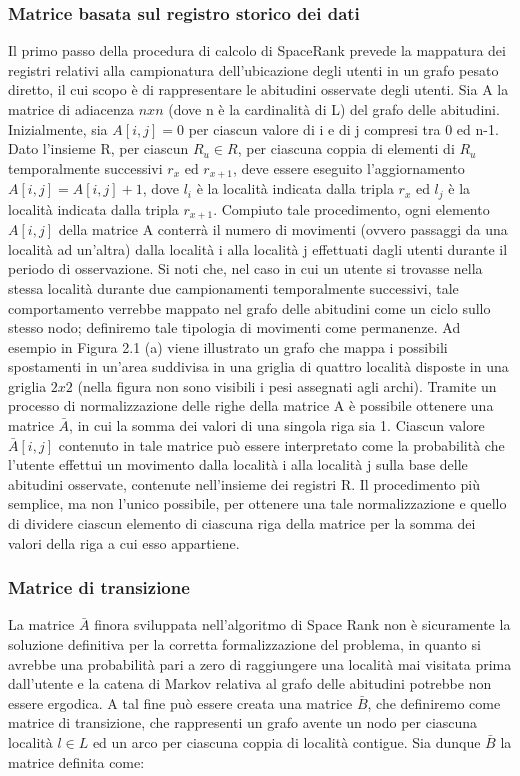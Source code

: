 \subsubsection{Matrice basata sul registro storico dei dati}
Il primo passo della procedura di calcolo di SpaceRank prevede la mappatura
dei registri relativi alla campionatura dell'ubicazione degli utenti in un grafo
pesato diretto, il cui scopo \`e di rappresentare le abitudini osservate degli utenti.
Sia A la matrice di adiacenza $n x n$ (dove n \`e la cardinalit\`a di L) del
grafo delle abitudini. Inizialmente, sia $A[i, j] = 0$ per ciascun valore di i e di
j compresi tra 0 ed n-1. Dato l'insieme R, per ciascun $R_{u} \in R$, per ciascuna
coppia di elementi di $R_{u}$ temporalmente successivi $r_{x}$ ed $r_{x+1}$, deve essere eseguito
l'aggiornamento $A[i, j] = A[i, j] + 1$, dove $l_{i}$ \`e la localit\`a indicata dalla
tripla $r_{x}$ ed $l_{j}$ \`e la localit\`a indicata dalla tripla $r_{x+1}$. Compiuto tale procedimento,
ogni elemento $A[i, j]$ della matrice A conterr\`a il numero di movimenti
(ovvero passaggi da una localit\`a ad un'altra) dalla localit\`a i alla localit\`a j effettuati
dagli utenti durante il periodo di osservazione. Si noti che, nel caso
in cui un utente si trovasse nella stessa localit\`a durante due campionamenti
temporalmente successivi, tale comportamento verrebbe mappato nel grafo
delle abitudini come un ciclo sullo stesso nodo; definiremo tale tipologia di
movimenti come permanenze.
Ad esempio in Figura 2.1 (a) viene illustrato un grafo che mappa i possibili
spostamenti in un'area suddivisa in una griglia di quattro localit\`a disposte in
una griglia $2 x 2$ (nella figura non sono visibili i pesi assegnati agli archi).
Tramite un processo di normalizzazione delle righe della matrice A \`e possibile
ottenere una matrice $\bar{A}$, in cui la somma dei valori di una singola riga sia 1.
Ciascun valore $\bar{A}[i, j]$ contenuto in tale matrice pu\`o essere interpretato come
la probabilit\`a che l'utente effettui un movimento dalla localit\`a i alla localit\`a
j sulla base delle abitudini osservate, contenute nell'insieme dei registri R. Il
procedimento pi\`u semplice, ma non l'unico possibile, per ottenere una tale
normalizzazione e quello di dividere ciascun elemento di ciascuna riga della
matrice per la somma dei valori della riga a cui esso appartiene.

\subsubsection{Matrice di transizione}
La matrice $\bar{A}$ finora sviluppata nell'algoritmo di Space Rank non \`e sicuramente
la soluzione definitiva per la corretta formalizzazione del problema, in quanto
si avrebbe una probabilit\`a pari a zero di raggiungere una localit\`a mai visitata
prima dall'utente e la catena di Markov relativa al grafo delle abitudini
potrebbe non essere ergodica. A tal fine pu\`o essere creata una matrice $\bar{B}$,
che definiremo come matrice di transizione, che rappresenti un grafo avente
un nodo per ciascuna localit\`a $l \in L$ ed un arco per ciascuna coppia di localit\`a
contigue. Sia dunque $\bar{B}$ la matrice definita come:

